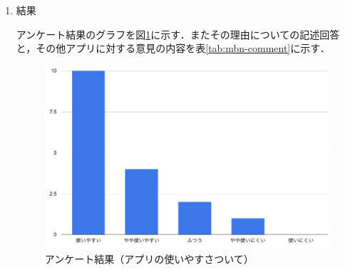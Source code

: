 \documentclass[a4paper]{jsarticle}
\begin{document}
\begin{enumerate}
\begin{enumerate}
    \item 結果

    アンケート結果のグラフを図\ref{fig:mbn-questionnaire}に示す．またその理由についての記述回答と，その他アプリに対する意見の内容を表\ref{tab:mbn-comment}に示す．


    \fifigure
    \begin{figure}[H]
      \begin{center}
        \includegraphics[width=0.8\hsize]{./images/mbn_questionnaire.jpg}
        \caption{アンケート結果（アプリの使いやすさついて）}
        \label{fig:mbn-questionnaire}
      \end{center}
    \end{figure}
    \fi


\end{enumerate}
\end{enumerate}
\end{document}
